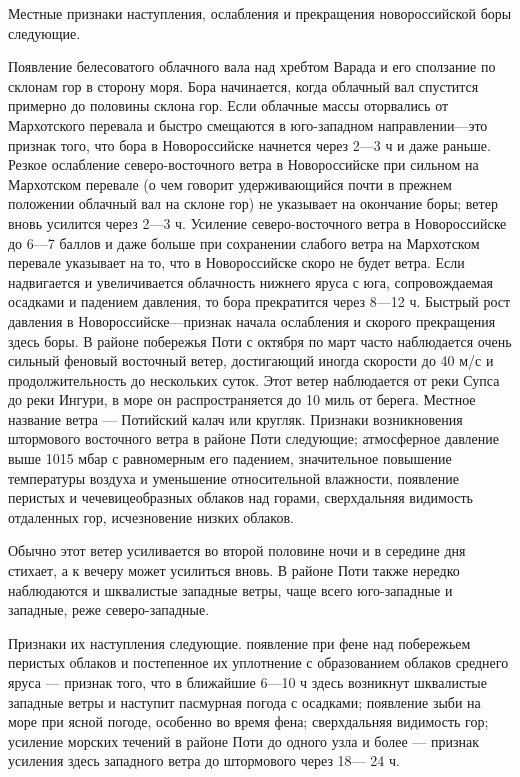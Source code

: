 Местные признаки наступления, ослабления и прекращения новороссийской боры следующие.

Появление белесоватого облачного вала над хребтом Варада и его сползание по склонам гор в сторону моря. Бора начинается, когда облачный вал спустится примерно до половины склона гор.
Если облачные массы оторвались от Мархотского перевала и быстро смещаются в юго-западном направлении—это признак того, что бора в Новороссийске начнется через 2—3 ч и даже раньше.
Резкое ослабление северо-восточного ветра в Новороссийске при сильном на Мархотском перевале (о чем говорит удерживающийся почти в прежнем положении облачный вал на склоне гор) не указывает на окончание боры; ветер вновь усилится через 2—3 ч.
Усиление северо-восточного ветра в Новороссийске до 6—7 баллов и даже больше при сохранении слабого ветра на Мархотском перевале указывает на то, что в Новороссийске скоро не будет ветра.
Если надвигается и увеличивается облачность нижнего яруса с юга, сопровождаемая осадками и падением давления, то бора прекратится через 8—12 ч.
Быстрый рост давления в Новороссийске—признак начала ослабления и скорого прекращения здесь боры.
В районе побережья Поти с октября по март часто наблюдается очень сильный феновый восточный ветер, достигающий иногда скорости до 40 м/с и продолжительность до нескольких суток. Этот ветер наблюдается от реки Супса до реки Ингури, в море он распространяется до 10 миль от берега. Местное название ветра — Потийский калач или кругляк. Признаки возникновения штормового восточного ветра в районе Поти следующие; атмосферное давление выше 1015 мбар с равномерным его падением, значительное повышение температуры воздуха и уменьшение относительной влажности, появление перистых и чечевицеобразных облаков над горами, сверхдальняя видимость отдаленных гор, исчезновение низких облаков.

Обычно этот ветер усиливается во второй половине ночи и в середине дня стихает, а к вечеру может усилиться вновь. В районе Поти также нередко наблюдаются и шквалистые западные ветры, чаще всего юго-западные и западные, реже северо-западные.

Признаки их наступления следующие. появление при фене над побережьем перистых облаков и постепенное их уплотнение с образованием облаков среднего яруса — признак того, что в ближайшие 6—10 ч здесь возникнут шквалистые западные ветры и наступит пасмурная погода с осадками; появление зыби на море при ясной погоде, особенно во время фена; сверхдальняя видимость гор; усиление морских течений в районе Поти до одного узла и более — признак усиления здесь западного ветра до штормового через 18— 24 ч.

